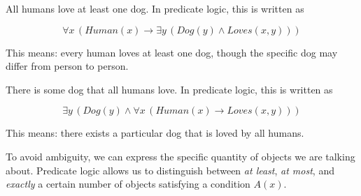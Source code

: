 All humans love at least one dog. In predicate logic, this is written as

\[
\forall x \, (Human(x) \rightarrow \exists y \, (Dog(y) \land Loves(x,y)))
\]

This means: every human loves at least one dog, though the specific dog
may differ from person to person.

There is some dog that all humans love. In predicate logic, this is
written as

\[
\exists y \, (Dog(y) \land \forall x \, (Human(x) \rightarrow Loves(x,y)))
\]

This means: there exists a particular dog that is loved by all humans.

To avoid ambiguity, we can express the specific quantity of objects we
are talking about. Predicate logic allows us to distinguish between
\emph{at least}, \emph{at most}, and \emph{exactly} a certain number of
objects satisfying a condition \(A(x)\).

